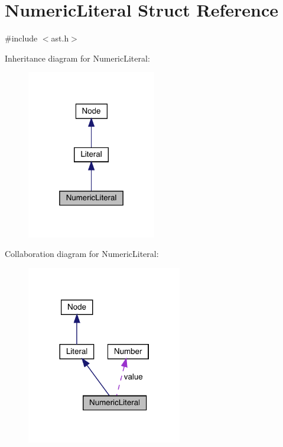 \hypertarget{struct_numeric_literal}{}\section{Numeric\+Literal Struct Reference}
\label{struct_numeric_literal}


{\ttfamily \#include $<$ast.\+h$>$}



Inheritance diagram for Numeric\+Literal\+:
\nopagebreak
\begin{figure}[H]
\begin{center}
\leavevmode
\includegraphics[width=160pt]{struct_numeric_literal__inherit__graph}
\end{center}
\end{figure}


Collaboration diagram for Numeric\+Literal\+:
\nopagebreak
\begin{figure}[H]
\begin{center}
\leavevmode
\includegraphics[width=192pt]{struct_numeric_literal__coll__graph}
\end{center}
\end{figure}
